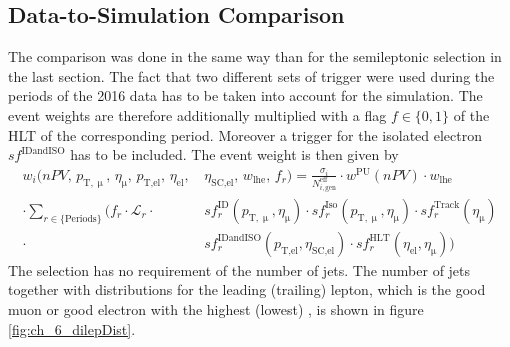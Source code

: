 \subsection{Data-to-Simulation Comparison}
The comparison was done in the same way than for the semileptonic selection in the last section. The fact that two different sets of trigger were used during the periods of the 2016 data has to be taken into account for the simulation. The event weights are therefore additionally multiplied with a flag $f \in \{0,1\}$ of the HLT of the corresponding period. Moreover a trigger for the isolated electron $sf^\textrm{IDandISO}$ has to be included. The event weight is then given by
\begin{equation}
\begin{split}
w_i(nPV,\, p_{\textrm{T},\upmu},\, \eta_\upmu,\, p_\textrm{T,el},\, \eta_\textrm{el},\, &\eta_\textrm{SC,el},\, w_\textrm{lhe},\, f_r) = \frac{\sigma_i}{N_{i,\textrm{gen}}^\textrm{eff}} \cdot w^\textrm{PU}(nPV) \cdot w_\textrm{lhe}\\
 \cdot \sum_{r \in \{\textrm{Periods}\}} \biggl( f_r  \cdot \mathcal{L}_r \cdot &sf^\textrm{ID}_r(p_{\textrm{T},\upmu},\eta_\upmu) \cdot sf^\textrm{Iso}_r(p_{\textrm{T},\upmu},\eta_\upmu) \cdot sf^\textrm{Track}_r(\eta_\upmu)  \\
  \cdot &sf^\textrm{IDandISO}_r(p_\textrm{T,el},\eta_\textrm{SC,el}) \cdot sf^\textrm{HLT}_r(\eta_\textrm{el},\eta_\upmu) \biggr)
\end{split}
\end{equation}
The selection has no requirement of the number of jets. The number of jets together with distributions for the leading (trailing) lepton, which is the good muon or good electron with the highest (lowest) {\pt}, is shown in figure \ref{fig:ch_6_dilepDist}. 



